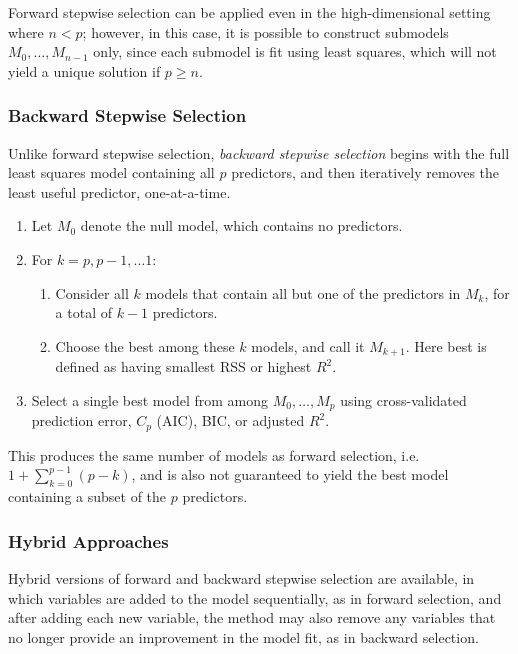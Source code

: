 \documentclass{article}
\numberwithin{equation}{section}
\begin{document}
\begin{enumerate}
Forward stepwise selection can be applied even in the high-dimensional setting where $n<p$; however, in this case, it is possible to construct submodels $M_0,\dots,M_{n-1}$ only, since each submodel is fit using least squares, which will not yield a unique solution if $p \geq n$.

\subsubsection*{Backward Stepwise Selection}
Unlike forward stepwise selection, \textit{backward stepwise selection} begins with the full least squares model containing all $p$ predictors, and then iteratively removes the least useful predictor, one-at-a-time.
\begin{enumerate}
    \item Let $M_0$ denote the null model, which contains no predictors.
    \item For $k = p, p-1,...1$:
    \begin{enumerate}
        \item Consider all $k$ models that contain all but one of the predictors in $M_k$, for a total of $k-1$ predictors.
        \item  Choose the best among these $k$ models, and call it $M_{k+1}$. Here best is defined as having smallest RSS or highest $R^2$.
    \end{enumerate}
    \item Select a single best model from among $M_0,\dots,M_p$ using cross-validated prediction error, $C_p$ (AIC), BIC, or adjusted $R^2$.
\end{enumerate}

This produces the same number of models as forward selection, i.e. $1 +\sum_{k=0}^{p-1} (p-k)$, and is also not guaranteed to yield the best model containing a subset of the $p$ predictors.

\subsubsection*{Hybrid Approaches}
Hybrid versions of forward and backward stepwise selection are available, in which variables are added to the model sequentially, as in forward selection, and after adding each new variable, the method may also remove any variables that no longer provide an improvement in the model fit, as in backward selection.


\end{enumerate}
\end{document}
